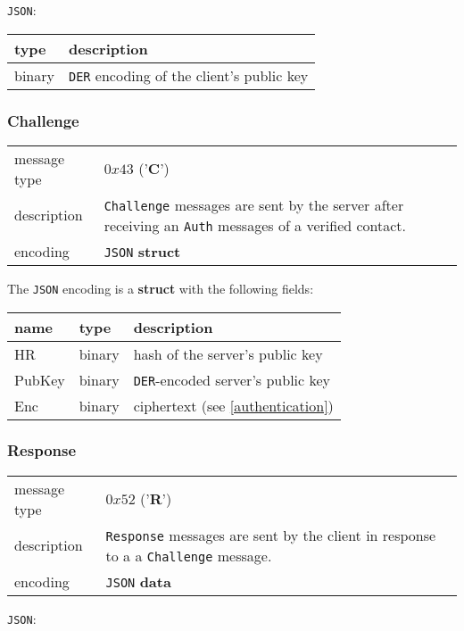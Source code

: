 \documentclass[12pt]{article}
\begin{document}
\texttt{JSON}:

\begin{tabular}{|l|l|}
\hline
type & description \\\hline\hline
binary & \texttt{DER} encoding of the client's public key \\\hline
\end{tabular}

\subsubsection*{Challenge}

\begin{tabular}{l p{}}
\hline
message type & $0x43$ ('\textbf{C}') \\
description & \texttt{Challenge} messages are sent by the server after receiving an \texttt{Auth} messages of a verified contact. \\
encoding & \texttt{JSON} \textbf{struct} \\
\end{tabular}

The \texttt{JSON} encoding is a \textbf{struct} with the following fields:

\begin{tabular}{|l|l|l|}
\hline
name & type & description \\\hline\hline
HR        & binary & hash of the server's public key \\\hline
PubKey    & binary & \texttt{DER}-encoded server's public key \\\hline
Enc       & binary & ciphertext (see \autoref{authentication}) \\\hline
\end{tabular}


\subsubsection*{Response}

\begin{tabular}{l p{}}
\hline
message type & $0x52$ ('\textbf{R}') \\
description & \texttt{Response} messages are sent by the client in response to a a \texttt{Challenge} message. \\
encoding & \texttt{JSON} \textbf{data} \\\hline
\end{tabular}

\texttt{JSON}:
\end{document}
